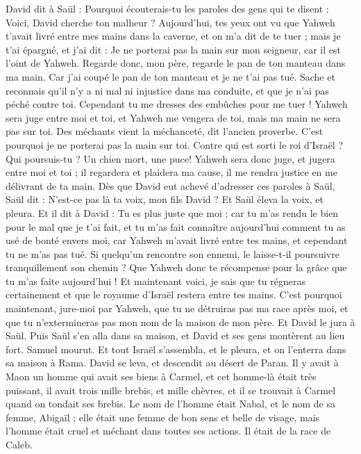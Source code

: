 \begin{multicols}{2}
David dit à Saül : Pourquoi écouterais-tu les paroles des gens qui te disent : Voici, David cherche ton malheur ?
Aujourd'hui, tes yeux ont vu que Yahweh t'avait livré entre mes mains dans la caverne, et on m'a dit de te tuer ; mais je t'ai épargné, et j'ai dit : Je ne porterai pas la main sur mon seigneur, car il est l'oint de Yahweh.
Regarde donc, mon père, regarde le pan de ton manteau dans ma main. Car j'ai coupé le pan de ton manteau et je ne t'ai pas tué. Sache et reconnais qu'il n'y a ni mal ni injustice dans ma conduite, et que je n'ai pas péché contre toi. Cependant tu me dresses des embûches pour me tuer !
Yahweh sera juge entre moi et toi, et Yahweh me vengera de toi, mais ma main ne sera pas sur toi.
Des méchants vient la méchanceté, dit l'ancien proverbe. C'est pourquoi je ne porterai pas la main sur toi.
Contre qui est sorti le roi d'Israël ? Qui poursuis-tu ? Un chien mort, une puce!
Yahweh sera donc juge, et jugera entre moi et toi ; il regardera et plaidera ma cause, il me rendra justice en me délivrant de ta main.
Dès que David eut achevé d'adresser ces paroles à Saül, Saül dit : N'est-ce pas là ta voix, mon fils David ? Et Saül éleva la voix, et pleura.
Et il dit à David : Tu es plus juste que moi ; car tu m'as rendu le bien pour le mal que je t'ai fait,
et tu m'as fait connaître aujourd'hui comment tu as usé de bonté envers moi, car Yahweh m'avait livré entre tes mains, et cependant tu ne m'as pas tué.
Si quelqu'un rencontre son ennemi, le laisse-t-il poursuivre tranquillement son chemin ? Que Yahweh donc te récompense pour la grâce que tu m'as faite aujourd'hui !
Et maintenant voici, je sais que tu régneras certainement et que le royaume d'Israël restera entre tes mains.
C'est pourquoi maintenant, jure-moi par Yahweh, que tu ne détruiras pas ma race après moi, et que tu n'extermineras pas mon nom de la maison de mon père.
Et David le jura à Saül. Puis Saül s'en alla dans sa maison, et David et ses gens montèrent au lieu fort.
\VerseOne{}Samuel mourut. Et tout Israël s'assembla, et le pleura, et on l'enterra dans sa maison à Rama. David se leva, et descendit au désert de Paran.
Il y avait à Maon un homme qui avait ses biens à Carmel, et cet homme-là était très puissant, il avait trois mille brebis, et mille chèvres, et il se trouvait à Carmel quand on tondait ses brebis.
Le nom de l'homme était Nabal, et le nom de sa femme, Abigaïl ; elle était une femme de bon sens et belle de visage, mais l'homme était cruel et méchant dans toutes ses actions. Il était de la race de Caleb.

\end{multicols}
